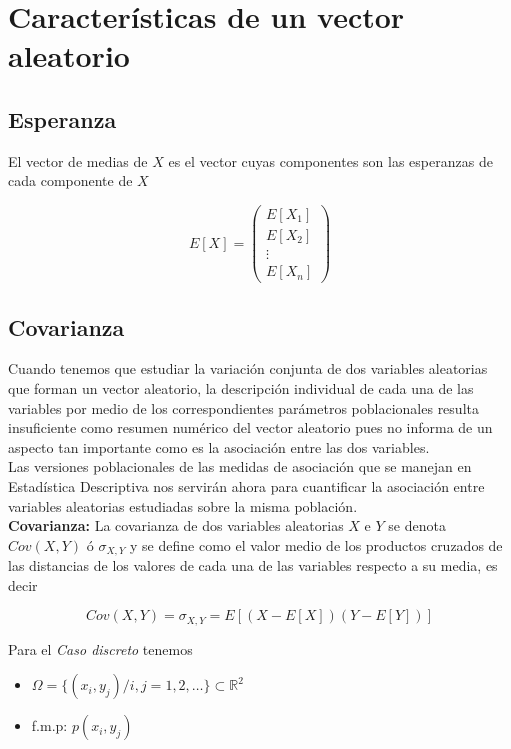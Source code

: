 \section{Características de un vector aleatorio}


\subsection{Esperanza}

El vector de medias de $X$ es el vector cuyas componentes son las esperanzas de cada componente de $X$

\[ E[X] = \left( \begin{matrix}
    E[X_1] \\
    E[X_2] \\
    \vdots \\
    E[X_n] 
\end{matrix} \right) \]

\subsection{Covarianza}

Cuando tenemos que estudiar la variación conjunta de dos variables aleatorias que forman un vector aleatorio,
la descripción individual de cada una de las variables por medio de los correspondientes parámetros poblacionales
resulta insuficiente como resumen numérico del vector aleatorio pues no informa de un aspecto tan importante
como es la asociación entre las dos variables. \\
Las versiones poblacionales de las medidas de asociación que se manejan en Estadística Descriptiva nos servirán
ahora para cuantificar la asociación entre variables aleatorias estudiadas sobre la misma población. \\

\textbf{Covarianza:} La covarianza de dos variables aleatorias $X$ e $Y$ se denota $Cov(X, Y)$ ó $\sigma_{X,Y}$
y se define como el valor medio de los productos cruzados de las distancias de los valores de cada una de las
variables respecto a su media, es decir

\[ Cov(X, Y) = \sigma_{X, Y} = E[(X - E[X])(Y - E[Y])] \]

\newpage

Para el \textit{Caso discreto} tenemos
\begin{itemize}
    \item $\Omega = \{(x_i, y_j)/ i, j = 1, 2, \dots\} \subset \mathbb{R}^2$
    \item f.m.p: $p(x_i, y_j)$
\end{itemize}


